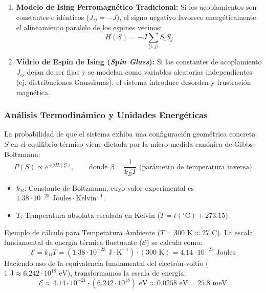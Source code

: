 \begin{enumerate}
    \item \textbf{Modelo de Ising Ferromagnético Tradicional:} Si los acoplamientos son constantes e idénticos ($J_{ij} = -J$), el signo negativo favorece energéticamente el alineamiento paralelo de los espines vecinos:
    \[
    H(\underline{S}) = -J \sum_{\langle i,j \rangle} S_i S_j
    \]
    \item \textbf{Vidrio de Espín de Ising (\textit{Spin Glass}):} Si las constantes de acoplamiento $J_{ij}$ dejan de ser fijas y se modelan como variables aleatorias independientes (ej. distribuciones Gaussianas), el sistema introduce desorden y frustración magnética.
\end{enumerate}

\subsubsection{Análisis Termodinámico y Unidades Energéticas}
\noindent 
La probabilidad de que el sistema exhiba una configuración geométrica concreta $\underline{S}$ en el equilibrio térmico viene dictada por la micro-medida canónica de Gibbs-Boltzmann:
\[
P(\underline{S}) \propto e^{-\beta H(\underline{S})}, \qquad \text{donde } \beta = \frac{1}{k_B T} \text{ (parámetro de temperatura inversa)}
\]
\begin{itemize}
    \item $k_B$: Constante de Boltzmann, cuyo valor experimental es $1.38 \cdot 10^{-23} \text{ Joules} \cdot \text{Kelvin}^{-1}$.
    \item $T$: Temperatura absoluta escalada en Kelvin ($T = t(^\circ\text{C}) + 273.15$).
\end{itemize}

\begin{ejemplo}
    Ejemplo de cálculo para Temperatura Ambiente ($T = 300\text{ K} \approx 27^\circ\text{C}$). La escala fundamental de energía térmica fluctuante ($\mathcal{E}$) se calcula como:
    \[
    \mathcal{E} = k_B T = (1.38 \cdot 10^{-23} \text{ J}\cdot\text{K}^{-1}) \cdot (300\text{ K}) = 4.14 \cdot 10^{-21} \text{ Joules}
    \]
    Haciendo uso de la equivalencia fundamental del electrón-voltio ($1 \text{ J} \approx 6.242 \cdot 10^{18} \text{ eV}$), transformamos la escala de energía:
    \[
    \mathcal{E} \approx 4.14 \cdot 10^{-21} \cdot (6.242 \cdot 10^{18}) \text{ eV} \approx 0.0258 \text{ eV} = 25.8 \text{ meV}
    \]

\end{ejemplo}



